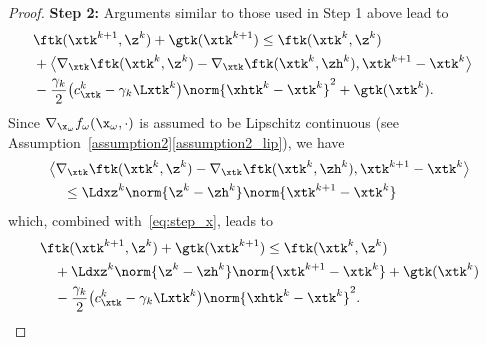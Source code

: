 \begin{proof}
\textbf{Step 2:} Arguments similar to those used in Step 1 above lead to
%
\begin{align} \label{eq:step_x}
    & \ftk (\xtk^{k+1}, \z^k) + \gtk (\xtk^{k+1}) \leq \ftk (\xtk^k, \z^k) & \nonumber \\
    & + \bigl\langle \nabla_{\xtk} \ftk (\xtk^k,\z^k) - \nabla_{\xtk} \ftk (\xtk^k,\zh^k), \xtk^{k+1} - \xtk^k \bigr\rangle & \nonumber \\
    & - \frac{\gamma_k}{2} \bigl( c_{\xtk}^k - \gamma_k \Lxtk^k \bigr) \norm{\xhtk^k - \xtk^k}^2 + \gtk(\xtk^k). &
\end{align}
%
Since $\nabla_{\x_\omega} f_\omega (\x_\omega,\cdot)$ is assumed to be Lipschitz continuous (see Assumption~\ref{assumption2}\ref{assumption2_lip}), we have
%
\begin{equation*}
\begin{split}
&\bigl\langle \nabla_{\xtk} \ftk (\xtk^k,\z^k) - \nabla_{\xtk} \ftk (\xtk^k,\zh^k), \xtk^{k+1} - \xtk^k \bigr\rangle \\
& \quad \leq  \Ldxz^k \norm{\z^k - \zh^k} \norm{\xtk^{k+1} - \xtk^k}
\end{split}
\end{equation*}
%
which, combined with~\eqref{eq:step_x}, leads to
%
\begin{equation} \label{eq:sufficient_decrease_x}
\begin{split}
& \ftk (\xtk^{k+1}, \z^k) + \gtk (\xtk^{k+1}) \leq \ftk (\xtk^k, \z^k) \\
& \quad + \Ldxz^k \norm{\z^k - \zh^k} \norm{\xtk^{k+1} - \xtk^k} + \gtk(\xtk^k)  \\
& \quad - \frac{\gamma_k}{2} \bigl( c_{\xtk}^k - \gamma_k \Lxtk^k \bigr) \norm{\xhtk^k - \xtk^k}^2 .
\end{split}
\end{equation}
%



\end{proof}
